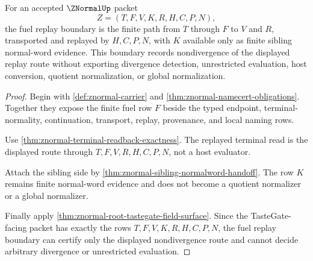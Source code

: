\begin{theorem}
\label{thm:znormal-fuel-replay-nondivergence-boundary}
For an accepted $\ZNormalUp$ packet
$$
Z=(T,F,V,K,R,H,C,P,N),
$$
the fuel replay boundary is the finite path from $T$ through $F$ to $V$ and
$R$, transported and replayed by $H,C,P,N$, with $K$ available only as finite
sibling normal-word evidence. This boundary records nondivergence of the
displayed replay route without exporting divergence detection, unrestricted
evaluation, host conversion, quotient normalization, or global normalization.
\end{theorem}
\begin{proof}
Begin with \autoref{def:znormal-carrier} and
\autoref{thm:znormal-namecert-obligations}. Together they expose the finite
fuel row $F$ beside the typed endpoint, terminal-normality, continuation,
transport, replay, provenance, and local naming rows.

Use \autoref{thm:znormal-terminal-readback-exactness}. The replayed terminal
read is the displayed route through $T,F,V,R,H,C,P,N$, not a host evaluator.

Attach the sibling side by
\autoref{thm:znormal-sibling-normalword-handoff}. The row $K$ remains finite
normal-word evidence and does not become a quotient normalizer or a global
normalizer.

Finally apply \autoref{thm:znormal-root-tastegate-field-surface}. Since the
TasteGate-facing packet has exactly the rows $T,F,V,K,R,H,C,P,N$, the fuel
replay boundary can certify only the displayed nondivergence route and cannot
decide arbitrary divergence or unrestricted evaluation.
\end{proof}

